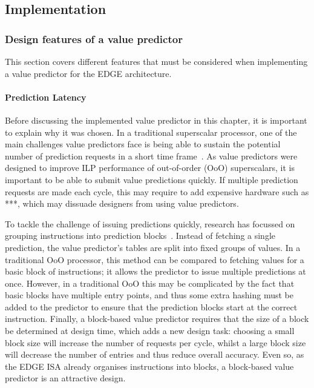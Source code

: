 \subsection{Implementation}

\subsubsection{Design features of a value predictor}

This section covers different features that must be considered when implementing a value predictor for the EDGE architecture.

\paragraph*{Prediction Latency} Before discussing the implemented value predictor in this chapter, it is important to explain why it was chosen.
In a traditional superscalar processor, one of the main challenges value predictors face is being able to sustain the potential number of prediction requests in a short time frame~\cite{peraisBeBop2015}.
As value predictors were designed to improve ILP performance of out-of-order (OoO) superscalars, it is important to be able to submit value predictions quickly.
If multiple prediction requests are made each cycle, this may require to add expensive hardware such as ***, which may dissuade designers from using value predictors.

To tackle the challenge of issuing predictions quickly, research has focussed on grouping instructions into prediction blocks~\cite{peraisBeBop2015}.
Instead of fetching a single prediction, the value predictor's tables are split into fixed groups of values.
In a traditional OoO processor, this method can be compared to fetching values for a basic block of instructions; it allows the predictor to issue multiple predictions at once.
However, in a traditional OoO this may be complicated by the fact that basic blocks have multiple entry points, and thus some extra hashing must be added to the predictor to ensure that the prediction blocks start at the correct instruction. %
Finally, a block-based value predictor requires that the size of a block be determined at design time, which adds a new design task: choosing a small block size will increase the number of requests per cycle, whilst a large block size will decrease the number of entries and thus reduce overall accuracy. %
Even so, as the EDGE ISA already organises instructions into blocks, a block-based value predictor is an attractive design.

